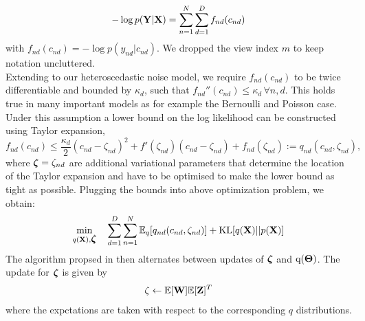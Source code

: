 \begin{equation*}
-\log p({\bf Y}|{\bf X}) = \sum_{n=1}^{N} \sum_{d=1}^{D} f_{nd} (c_{nd})
\end{equation*}
with $f_{nd}(c_{nd}) = -\log p(y_{nd}|c_{nd})$. We dropped the view index $m$ to keep notation uncluttered.\\
Extending \cite{seeger} to our heteroscedastic noise model, we require $f_{nd}(c_{nd})$ to be twice differentiable and bounded by $\kappa_d$, such that $f_{nd}''(c_{nd}) \leq \kappa_d \,\forall n,d$. This holds true in many important models as for example the Bernoulli and Poisson case. Under this assumption a lower bound on the log likelihood can be constructed using Taylor expansion,
\begin{equation*}
f_{nd}(c_{nd}) \leq \frac{\kappa_d}{2} (c_{nd} - \zeta_{nd})^2 + f'(\zeta_{nd})(c_{nd} - \zeta_{nd}) + f_{nd}(\zeta_{nd}) := q_{nd}(c_{nd},\zeta_{nd}),
\end{equation*}
where $\mbox{\boldmath $\zeta$} =  \zeta_{nd} $ are additional variational parameters that determine the location of the Taylor expansion and have to be optimised to make the lower bound as tight as possible. Plugging the bounds into above optimization problem, we obtain:
\begin{equation*}
\min_{q({\bf X}),\mbox{\boldmath $\zeta$}} \quad \sum_{d=1}^{D}\sum_{n=1}^{N} \mathbb{E}_q [ q_{nd}(c_{nd},\zeta_{nd})] + {\rm KL}[q({\bf X})||p({\bf X})]
\end{equation*}
The algorithm propsed in \cite{seeger} then alternates between updates of $\mbox{\boldmath $\zeta$}$ and $\mathrm{q}(\mbox{\boldmath $\Theta$})$. The update for $\mbox{\boldmath $\zeta$}$ is given by
\begin{equation*}
\zeta \leftarrow \mathbb{E}[{\bf W}]\mathbb{E}[{\bf Z}]^{T}
\end{equation*}
where the expctations are taken with respect to the corresponding $q$ distributions.\\
